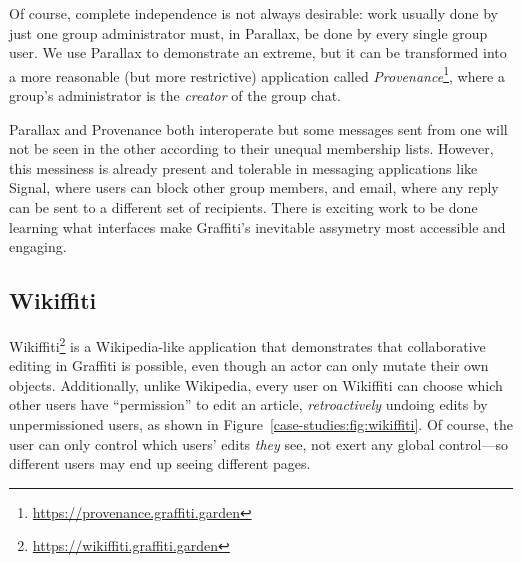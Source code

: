 Of course, complete independence is not always desirable:
work usually done by just one group administrator must, in Parallax,
be done by every single group user.
We use Parallax to demonstrate an extreme,
but it can be
transformed into a more reasonable (but more restrictive) application called \emph{Provenance}\footnote{
\url{https://provenance.graffiti.garden}
},
where a group's administrator is the  \emph{creator} of the group chat.


Parallax and Provenance both interoperate
but some messages sent from one will not be seen in the other
according to their unequal membership lists. However, this messiness is already present and tolerable
in messaging applications like Signal, where users can block other group members,
and email, where any reply can be sent to a different set of recipients.
There is exciting work to be done learning what interfaces make
Graffiti's inevitable assymetry most accessible and engaging.




\subsection{Wikiffiti}

Wikiffiti\footnote{
\url{https://wikiffiti.graffiti.garden}
} is a Wikipedia-like application that demonstrates that
collaborative editing in Graffiti is possible,
even though an actor can only mutate their own objects.
Additionally, unlike Wikipedia,
every user on Wikiffiti can choose which other users have ``permission'' to edit an article,
\emph{retroactively} undoing edits by unpermissioned users,
as shown in Figure~\ref{case-studies:fig:wikiffiti}.  Of course, the user can only control which users' edits \emph{they} see, not exert any global control---so different users may end up seeing different pages.

